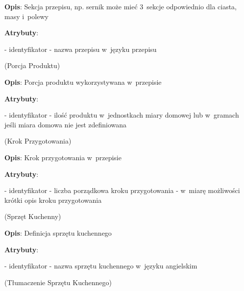 \begin{enumerate}[label={\textbf{KAT/\protect\threedigits{\theenumi}}}, wide, labelwidth=!, labelindent=0pt, labelsep=0pt, series=reqs]
    \textbf{Opis}: Sekcja przepisu, np. sernik może mieć 3~sekcje odpowiednio dla ciasta, masy i~polewy
    \par
    \textbf{Atrybuty}:
    \begin{itemize}[series=atr, wide, align=left, leftmargin=190pt]
        \label{kat:RecipeSection:id}- identyfikator
        \label{kat:RecipeSection:sectionName}- nazwa przepisu w~języku przepisu
    \end{itemize}

    \label{kat:ProductPortion} (Porcja Produktu)

    \textbf{Opis}: Porcja produktu wykorzystywana w~przepisie
    \par
    \textbf{Atrybuty}:
    \begin{itemize}[series=atr, wide, align=left, leftmargin=190pt]
        \label{kat:ProductPortion:id}- identyfikator
        \label{kat:ProductPortion:amount}- ilość produktu w~jednostkach miary domowej lub w~gramach jeśli miara domowa nie jest zdefiniowana
    \end{itemize}

    \label{kat:PreparationStep} (Krok Przygotowania)

    \textbf{Opis}: Krok przygotowania w~przepisie
    \par
    \textbf{Atrybuty}:
    \begin{itemize}[series=atr, wide, align=left, leftmargin=190pt]
        \label{kat:PreparationStep:id}- identyfikator
        \label{kat:PreparationStep:ordinalNumber}- liczba porządkowa kroku przygotowania
        \label{kat:PreparationStep:stepDescription}- w~miarę możliwości krótki opis kroku przygotowania
    \end{itemize}

    \label{kat:KitchenAppliance} (Sprzęt Kuchenny)

    \textbf{Opis}: Definicja sprzętu kuchennego
    \par
    \textbf{Atrybuty}:
    \begin{itemize}[series=atr, wide, align=left, leftmargin=190pt]
        \label{kat:KitchenAppliance:id}- identyfikator
        \label{kat:KitchenAppliance:name}- nazwa sprzętu kuchennego w~języku angielskim
    \end{itemize}

    \label{kat:KitchenApplianceTranslation} (Tłumaczenie Sprzętu Kuchennego)


\end{enumerate}
